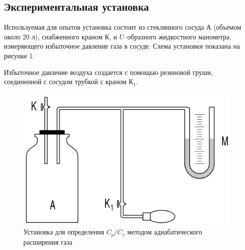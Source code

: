 \documentclass[a4paper,12pt]{article}
\theoremstyle{plain} %
\theoremstyle{definition} %
\theoremstyle{remark} %
\begin{document}
	\subsection{Экспериментальная установка}
	Используемая для опытов установка состоит из стеклянного сосуда $\text{А}$ (объемом около 20 л), снабженного краном $\text{К}$, и $U$--образного жидкостного манометра, измеряющего избыточное давление газа в сосуде. Схема установки показана на рисунке 1.
	
	Избыточное давление воздуха создается с помощью резиновой груши, соединенной с сосудом трубкой с краном $\text{К}_1$. 
	\begin{figure}[H]
		\begin{center}
			\includegraphics[width=0.7\linewidth]{1}
			\caption{Установка для определения $C_p/C_v$ методом адиабатического расширения газа}
		\end{center}
	\end{figure}
\end{document}
